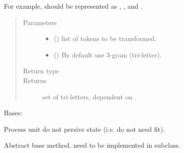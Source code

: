 \documentclass[letterpaper,10pt,english]{sphinxmanual}
\begin{document}
\begin{fulllineitems}
\begin{fulllineitems}
For example,  should be represented as ,
,  and .
\begin{quote}\begin{description}
\item[{Parameters}] \leavevmode\begin{itemize}
\item {} 
 () \textendash{} list of tokens to be transformed.

\item {} 
 () \textendash{} By default use 3-gram (tri-letter).

\end{itemize}

\item[{Return type}] \leavevmode
{}

\item[{Returns}] \leavevmode
set of tri-letters, dependent on .

\end{description}\end{quote}

\end{fulllineitems}


\end{fulllineitems}


\begin{fulllineitems}
\label{\detokenize{matchzoo:matchzoo.preprocessors.ProcessorUnit}}
Bases: 

Process unit do not persive state (i.e. do not need fit).

\begin{fulllineitems}
\label{\detokenize{matchzoo:matchzoo.preprocessors.ProcessorUnit.transform}}
Abstract base method, need to be implemented in subclass.

\end{fulllineitems}


\end{fulllineitems}
\end{document}
